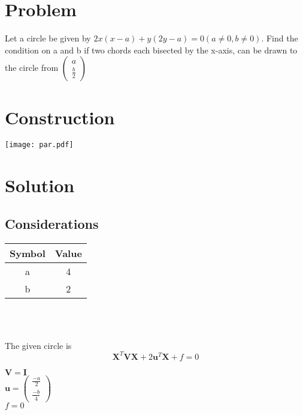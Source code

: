 \documentclass[10pt, a4paper]{article}
\title{\mytitle}
\author{\myauthor\hspace{1em}\\\contact\\FWC22040\hspace{6.5em}IITH\hspace{0.5em}\mymodule\hspace{6em}ASSIGN-5}
\date{}
\newcommand{\myvec}[1]{\ensuremath{\begin{pmatrix}#1\end{pmatrix}}}
\let\vec\mathbf
\begin{document}
 \maketitle
 \tableofcontents
 \section{Problem}
 Let a circle be given by $2x(x-a)+y(2y-a)=0 (a\neq0, b\neq0) $. Find the condition    on  a and b  if two chords each bisected by the x-axis, can be drawn to the circle from $\myvec{a\\ \frac{b}{2}}$
 \section{Construction}
 \texttt{[image: par.pdf]}
 \section{Solution}
 \begin{center}
 \subsection{Considerations}
 \begin{tabular}{|c|c|}
 \hline
 \textbf{Symbol}&\textbf{Value}\\
 \hline
 a&4\\
 \hline
 b&2\\
 \hline
\end{tabular}\\
\ 
\\
\end{center}
\begin{center}
The given circle is 
\begin{equation}
	\vec{X}^T\vec{V}\vec{X} + 2\vec{u}^T\vec{X} + f = 0
\end{equation}
\begin{center}
    $\vec{V} = \vec{I}$ \\
    $\vec{u} = \myvec{\frac{-a}{2} \\ \frac{-b}{4}}$\\
    $f=0$
\end{center}
\end{center}
\end{document}
